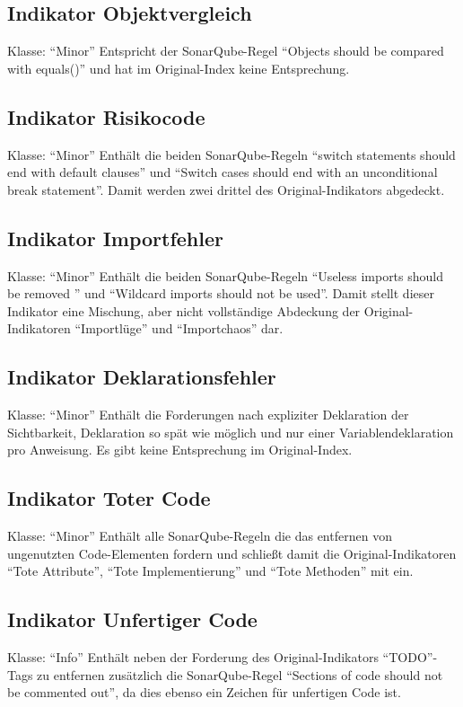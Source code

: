 \documentclass[da,ngerman]{stthesis}
\begin{document}
  			\subsection{Indikator Objektvergleich}
  				Klasse: "`Minor"' \newline
  				Entspricht der SonarQube-Regel "`Objects should be compared with equals()"' und hat im Original-Index keine Entsprechung.
  			\subsection{Indikator Risikocode}
  				Klasse: "`Minor"' \newline
  				Enthält die beiden SonarQube-Regeln "`switch statements should end with default clauses"' und "`Switch cases should end with an unconditional break statement"'. Damit werden zwei drittel des Original-Indikators abgedeckt.
  			\subsection{Indikator Importfehler}
  				Klasse: "`Minor"' \newline
  				Enthält die beiden SonarQube-Regeln "`Useless imports should be removed
"' und "`Wildcard imports should not be used"'. Damit stellt dieser Indikator eine Mischung, aber nicht vollständige Abdeckung der Original-Indikatoren "`Importlüge"' und "`Importchaos"' dar.
			\subsection{Indikator Deklarationsfehler}
				Klasse: "`Minor"' \newline
				Enthält die Forderungen nach expliziter Deklaration der Sichtbarkeit, Deklaration so spät wie möglich und nur einer Variablendeklaration pro Anweisung. Es gibt keine Entsprechung im Original-Index.
			\subsection{Indikator Toter Code}
				Klasse: "`Minor"' \newline
				Enthält alle SonarQube-Regeln die das entfernen von ungenutzten Code-Elementen fordern und schließt damit die Original-Indikatoren "`Tote Attribute"', "`Tote Implementierung"' und "`Tote Methoden"' mit ein.
			\subsection{Indikator Unfertiger Code}
				Klasse: "`Info"' \newline
				Enthält neben der Forderung des Original-Indikators "`TODO"'-Tags zu entfernen zusätzlich die SonarQube-Regel "`Sections of code should not be commented out"', da dies ebenso ein Zeichen für unfertigen Code ist.
\end{document}
